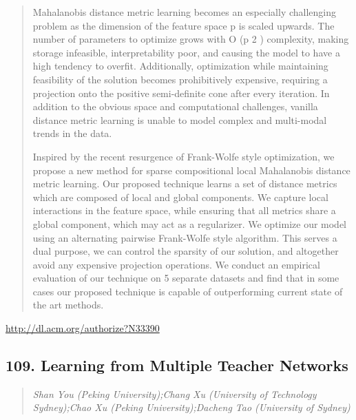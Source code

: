 \documentclass{article}
\begin{document}
\begin{quote}
Mahalanobis distance metric learning becomes an especially challenging problem as the dimension of the feature space p is scaled upwards. The number of parameters to optimize grows with O (p 2 ) complexity, making storage infeasible, interpretability poor, and causing the model to have a high tendency to overfit. Additionally, optimization while maintaining feasibility of the solution becomes prohibitively expensive, requiring a projection onto the positive semi-definite cone after every iteration. In addition to the obvious space and computational challenges, vanilla distance metric learning is unable to model complex and multi-modal trends in the data.







  Inspired by the recent resurgence of Frank-Wolfe style optimization, we propose a new method for sparse compositional local Mahalanobis distance metric learning. Our proposed technique learns a set of distance metrics which are composed of local and global components. We capture local interactions in the feature space, while ensuring that all metrics share a global component, which may act as a regularizer. We optimize our model using an alternating pairwise Frank-Wolfe style algorithm. This serves a dual purpose, we can control the sparsity of our solution, and altogether avoid any expensive projection operations. We conduct an empirical evaluation of our technique on 5 separate datasets and find that in some cases our proposed technique is capable of outperforming current state of the art methods.
\end{quote}

\href{http://dl.acm.org/authorize?N33390}{http://dl.acm.org/authorize?N33390}

\subsection{109. Learning from Multiple Teacher Networks}

\begin{quote}
\footnotesize{\textit{Shan You (Peking University);Chang Xu (University of Technology Sydney);Chao Xu (Peking University);Dacheng Tao (University of Sydney)}}

\end{quote}
\end{document}
